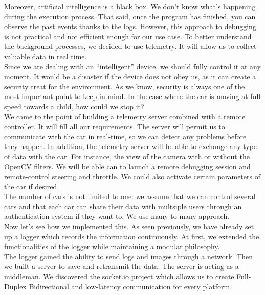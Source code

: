 \documentclass[12pt]{article}
\begin{document}
Moreover, artificial intelligence is a black box. We don't know what's happening during the execution process. That said, once the program has finished, you can observe the past events thanks to the logs. However, this approach to debugging is not practical and not efficient enough for our use case. To better understand the background processes, we decided to use telemetry. It will allow us to collect valuable data in real time. \\

Since we are dealing with an “intelligent” device, we should fully control it at any moment. It would be a disaster if the device does not obey us, as it can create a security treat for the environment. As we know, security is always one of the most important point to keep in mind. In the case where the car is moving at full speed towards a child, how could we stop it? \\

We came to the point of building a telemetry server combined with a remote controller. It will fill all our requirements. The server will permit us to communicate with the car in real-time, so we can detect any problems before they happen. In addition, the telemetry server will be able to exchange any type of data with the car. For instance, the view of the camera with or without the OpenCV filters. We will be able can to launch a remote debugging session and remote-control steering and throttle. We could also activate certain parameters of the car if desired. \\

The number of cars is not limited to one: we assume that we can control several cars and that each car can share their data with multsiple users through an authentication system if they want to. We use many-to-many approach. \\

Now let's see how we implemented this. As seen previously, we have already set up a logger which records the information continuously. At first, we extended the functionalities of the logger while maintaining a modular philosophy. \\

The logger gained the ability to send logs and images through a network. Then we built a server to save and retransmit the data. The server is acting as a middleman. We discovered the socket.io project which allows us to create Full-Duplex Bidirectional and low-latency communication for every platform. \\
\end{document}
